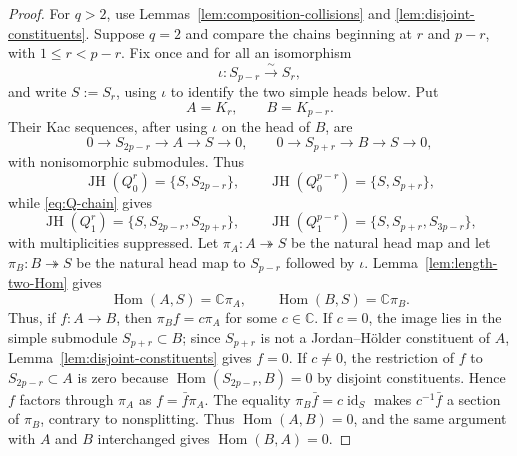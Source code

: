 \documentclass[12pt,leqno]{amsart}
\numberwithin{equation}{section}
\newcommand{\Hom}{\operatorname{Hom}}
\newcommand{\id}{\operatorname{id}}
\def\C{\mathbb{C}}
\begin{document}
\begin{proof}
For $q>2$, use Lemmas~\ref{lem:composition-collisions} and
\ref{lem:disjoint-constituents}.  Suppose $q=2$ and compare the chains beginning at $r$ and $p-r$, with
$1\le r<p-r$.  Fix once and for all an isomorphism
\[
 \iota:S_{p-r}\xrightarrow{\sim}S_r,
\]
and write $S:=S_r$, using $\iota$ to identify the two simple heads below.
Put
\[
 A=K_r,\qquad B=K_{p-r}.
\]
Their Kac sequences, after using $\iota$ on the head of $B$, are
\[
 0\to S_{2p-r}\to A\to S\to0,
 \qquad
 0\to S_{p+r}\to B\to S\to0,
\]
with nonisomorphic submodules.  Thus
\[
 \operatorname{JH}(Q_0^r)=\{S,S_{2p-r}\},\qquad
 \operatorname{JH}(Q_0^{p-r})=\{S,S_{p+r}\},
\]
while \eqref{eq:Q-chain} gives
\[
 \operatorname{JH}(Q_1^r)=\{S,S_{2p-r},S_{2p+r}\},\qquad
 \operatorname{JH}(Q_1^{p-r})=\{S,S_{p+r},S_{3p-r}\},
\]
with multiplicities suppressed.  Let $\pi_A:A\twoheadrightarrow S$ be the
natural head map and let $\pi_B:B\twoheadrightarrow S$ be the natural
head map to $S_{p-r}$ followed by $\iota$.  Lemma~\ref{lem:length-two-Hom} gives
\[
 \Hom(A,S)=\C\pi_A,\qquad \Hom(B,S)=\C\pi_B.
\]
Thus, if $f:A\to B$, then $\pi_Bf=c\pi_A$ for some $c\in\C$.
If $c=0$, the image lies in the simple submodule $S_{p+r}\subset B$; since
$S_{p+r}$ is not a Jordan--H\"older constituent of $A$,
Lemma~\ref{lem:disjoint-constituents} gives $f=0$.  If $c\neq0$, the
restriction of $f$ to $S_{2p-r}\subset A$ is zero because
$\Hom(S_{2p-r},B)=0$ by disjoint constituents.  Hence $f$ factors through
$\pi_A$ as $f=\bar f\pi_A$.  The equality
$\pi_B\bar f=c\id_S$ makes $c^{-1}\bar f$ a section of $\pi_B$, contrary
to nonsplitting.  Thus $\Hom(A,B)=0$, and the same argument with $A$ and
$B$ interchanged gives $\Hom(B,A)=0$.


\end{proof}
\end{document}

